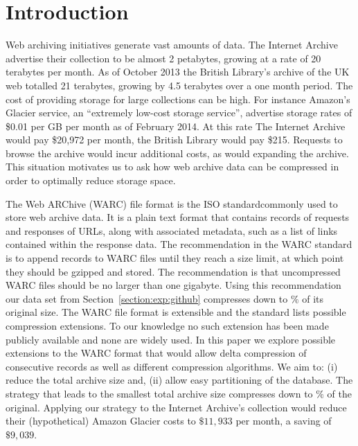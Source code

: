\documentclass[11pt]{article}
\begin{document}
\section{Introduction}

Web archiving initiatives generate vast amounts of data. The Internet Archive advertise their collection to be almost 2 petabytes, growing at a rate of 20 terabytes per month\footnotemark. As of October 2013 the British Library's archive of the UK web totalled 21 terabytes, growing by 4.5 terabytes over a one month period\footnotemark. The cost of providing storage for large collections can be high. For instance Amazon's Glacier service, an ``extremely low-cost storage service'', advertise storage rates of \$0.01 per GB per month as of February 2014. At this rate The Internet Archive would pay \$20,972 per month, the British Library would pay \$215. Requests to browse the archive would incur additional costs, as would expanding the archive. This situation motivates us to ask how web archive data can be compressed in order to optimally reduce storage space.

The Web ARChive (WARC) file format is the ISO standard\footnotemark commonly used to store web archive data. It is a plain text format that contains records of requests and responses of URLs, along with associated metadata, such as a list of links contained within the response data. The recommendation in the WARC standard is to append records to WARC files until they reach a size limit, at which point they should be gzipped and stored. The recommendation is that uncompressed WARC files should be no larger than one gigabyte. Using this recommendation our data set from Section~\ref{section:exp:github} compresses down to $\%$ of its original size. The WARC file format is extensible and the standard lists possible compression extensions. To our knowledge no such extension has been made publicly available and none are widely used. In this paper we explore possible extensions to the WARC format that would allow delta compression of consecutive records as well as different compression algorithms. We aim to: (i) reduce the total archive size and, (ii) allow easy partitioning of the database. The strategy that leads to the smallest total archive size compresses down to $\%$ of the original. Applying our strategy to the Internet Archive's collection would reduce their (hypothetical) Amazon Glacier costs to $\$11,933$ per month, a saving of $\$9,039$.

\end{document}
